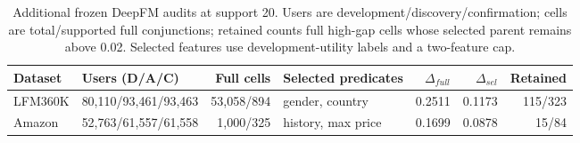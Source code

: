 \begin{table}[t]
\centering
\caption{Additional frozen DeepFM audits at support 20. Users are development/discovery/confirmation; cells are total/supported full conjunctions; retained counts full high-gap cells whose selected parent remains above 0.02. Selected features use development-utility labels and a two-feature cap.}
\label{tab:additional-datasets}
\small
\begin{tabular}{llrlrrr}
\toprule
Dataset & Users (D/A/C) & Full cells & Selected predicates & $\Delta_{full}$ & $\Delta_{sel}$ & Retained \\
\midrule
LFM360K & 80,110/93,461/93,463 & 53,058/894 & gender, country & 0.2511 & 0.1173 & 115/323 \\
Amazon & 52,763/61,557/61,558 & 1,000/325 & history, max price & 0.1699 & 0.0878 & 15/84 \\
\bottomrule
\end{tabular}
\end{table}
